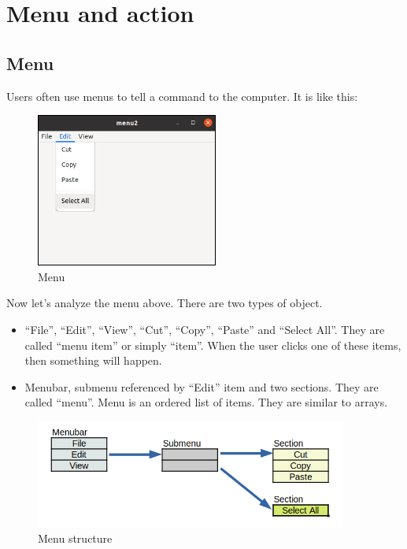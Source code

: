 \hypertarget{menu-and-action}{%
\section{Menu and action}\label{menu-and-action}}

\hypertarget{menu}{%
\subsection{Menu}\label{menu}}

Users often use menus to tell a command to the computer. It is like
this:

\begin{figure}
\centering
\includegraphics[width=5.985cm,height=5.055cm]{../image/menu.png}
\caption{Menu}
\end{figure}

Now let's analyze the menu above. There are two types of object.

\begin{itemize}
\tightlist
\item
  ``File'', ``Edit'', ``View'', ``Cut'', ``Copy'', ``Paste'' and
  ``Select All''. They are called ``menu item'' or simply ``item''. When
  the user clicks one of these items, then something will happen.
\item
  Menubar, submenu referenced by ``Edit'' item and two sections. They
  are called ``menu''. Menu is an ordered list of items. They are
  similar to arrays.
\end{itemize}

\begin{figure}
\centering
\includegraphics[width=10.23cm,height=3.57cm]{../image/menu_structure.png}
\caption{Menu structure}
\end{figure}

